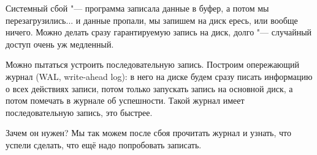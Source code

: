 Системный сбой "--- программа записала данные в буфер, а потом мы перезагрузились... и данные пропали, мы запишем на диск ересь, или вообще ничего.
Можно делать сразу гарантируемую запись на диск, долго "--- случайный доступ очень уж медленный.

Можно пытаться устроить последовательную запись.
Построим опережающий журнал (WAL, write-ahead log): в него на диске будем сразу писать информацию о всех действиях записи,
потом только запускать запись на основной диск, а потом помечать в журнале об успешности.
Такой журнал имеет последовательную запись, это быстрее.

Зачем он нужен? Мы так можем после сбоя прочитать журнал и узнать, что успели сделать, что ещё надо попробовать записать.
